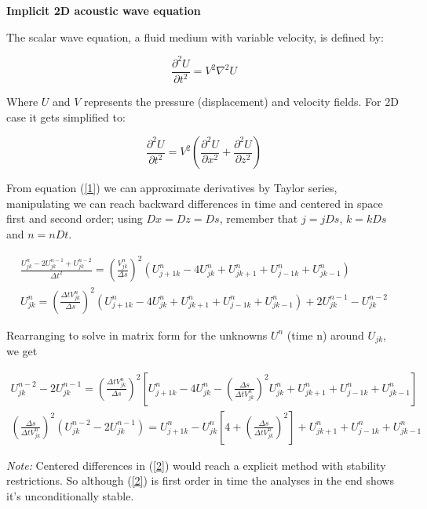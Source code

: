 \documentclass[legalpaper, 12pt]{article}
\begin{document}
\textbf{Implicit 2D acoustic wave equation }

The scalar wave equation, a fluid medium with variable velocity, is defined by:

\[ \frac{\partial^2 U}{\partial t^2} = V^2 \nabla^2 U \]

Where $U$ and $V$ represents the pressure (displacement) and velocity fields. For 2D case it gets simplified to:

\begin{equation}
\frac{\partial^2 U}{\partial t^2} = V^2 \left( \frac{\partial^2 U}{\partial x^2}+ \frac{\partial^2 U}{\partial z^2} \right)
\label{1}
\end{equation}

From equation (\ref{1}) we can approximate derivatives by Taylor series, manipulating we can reach backward differences in time and centered in space first and second order; using $Dx=Dz=Ds$, remember that $j=jDs$, $k=kDs$ and $n=nDt$.

\begin{eqnarray}
\frac{U_{jk}^n -2 U_{jk}^{n-1} + U_{jk}^{n-2}}{\Delta t^2} =  \left( \frac{V_{jk}^n}{\Delta s} \right) ^2 \left(  U_{j+1k}^n - 4 U_{jk}^n + U_{jk+1}^n + U_{j-1k}^n + U_{jk-1}^n  \right)
\label{2} \\
U_{jk}^n  =  \left( \frac{\Delta t  V_{jk}^n}{\Delta s} \right) ^2 \left(  U_{j+1k}^n - 4 U_{jk}^n + U_{jk+1}^n + U_{j-1k}^n + U_{jk-1}^n  \right) + 2 U_{jk}^{n-1} - U_{jk}^{n-2} \nonumber
\end{eqnarray}

Rearranging to solve in matrix form for the unknowns $ U^n $ (time n) around $U_{jk}$, we get 

\begin{multline}
 U_{jk}^{n-2} -2 U_{jk}^{n-1} =  \left( \frac{\Delta t  V_{jk}^n}{\Delta s} \right) ^2 \left[  U_{j+1k}^n - 4 U_{jk}^n - \left( \frac{\Delta s}{\Delta t  V_{jk}^n} \right) ^2  U_{jk}^n + U_{jk+1}^n + U_{j-1k}^n + U_{jk-1}^n  \right] \\
\left( \frac{\Delta s}{ \Delta t  V_{jk}^n} \right) ^2 \left( U_{jk}^{n-2} -2 U_{jk}^{n-1} \right) = U_{j+1k}^n - U_{jk}^n \left[ 4+ \left( \frac{\Delta s}{\Delta t  V_{jk}^n} \right) ^2  \right]  + U_{jk+1}^n + U_{j-1k}^n + U_{jk-1}^n \label{3}
\end{multline}

\textit{Note:} Centered differences in  (\ref{2}) would reach a explicit method with stability restrictions. So although (\ref{2}) is first order in time the analyses in the end shows it's unconditionally stable.
\end{document}
